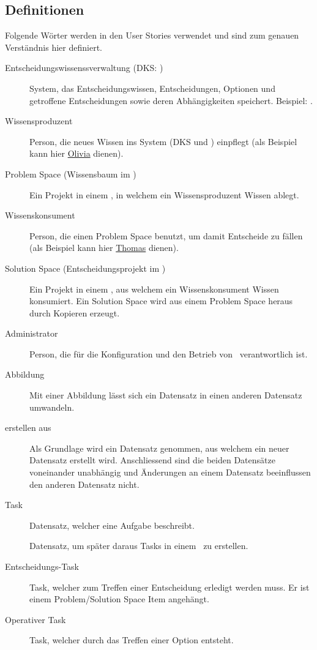 	\subsection{Definitionen}\label{userstoryDefinitions}
		Folgende Wörter werden in den User Stories verwendet und sind zum genauen Verständnis hier definiert.
		\begin{description}			
			\item[Entscheidungswissenssverwaltung (DKS: \dks)] System, 
				das Entscheidungswissen, Entscheidungen, Optionen und getroffene Entscheidungen 
				sowie deren Abhängigkeiten speichert. Beispiel: \cdar.
			\item[Wissensproduzent] Person, die neues Wissen ins System (DKS und \eeppi)
				 einpflegt (als Beispiel kann hier \hyperref[olivia]{Olivia} dienen).
			\item[Problem Space (Wissensbaum im \cdar)] Ein Projekt in einem \dks, 
				in welchem ein Wissensproduzent Wissen ablegt.
			\item[Wissenskonsument] Person, die einen Problem Space benutzt,
				 um damit Entscheide zu fällen 
				 (als Beispiel kann hier \hyperref[thomas]{Thomas} dienen).
			\item[Solution Space (Entscheidungsprojekt im \cdar)] Ein Projekt in einem \dks, 
				aus welchem ein Wissenskonsument Wissen konsumiert.
				Ein Solution Space wird aus einem Problem Space heraus durch Kopieren erzeugt.
			\item[Administrator] Person, die für die Konfiguration 
				und den Betrieb von \eeppi\ verantwortlich ist.
			\item[Abbildung] Mit einer Abbildung lässt sich ein Datensatz 
				in einen anderen Datensatz umwandeln.
			\item[erstellen aus] Als Grundlage wird ein Datensatz genommen, 
				aus welchem ein neuer Datensatz erstellt wird.
				Anschliessend sind die beiden Datensätze voneinander unabhängig 
				und Änderungen an einem Datensatz beeinflussen den anderen Datensatz nicht.
			\item[Task] Datensatz, welcher eine Aufgabe beschreibt.
			\item[\ttpl] Datensatz, um später daraus Tasks in einem \ppt\ zu erstellen.
			\item[Entscheidungs-Task] Task, 
				welcher zum Treffen einer Entscheidung erledigt werden muss.
				Er ist einem Problem/Solution Space Item angehängt.
			\item[Operativer Task] Task, welcher durch das Treffen einer Option entsteht.

\end{description}
